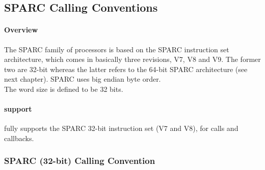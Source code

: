 %
%
%
%

\subsection{SPARC Calling Conventions}

\paragraph{Overview}

The SPARC family of processors is based on the SPARC instruction set architecture, which comes in basically three revisions,
V7, V8\cite{SPARCV8}\cite{SPARCSysV} and V9\cite{SPARCV9}\cite{SPARCV9SysV}. The former two are 32-bit whereas the latter refers to the 64-bit SPARC architecture (see next chapter).
SPARC uses big endian byte order.\\
The word size is defined to be 32 bits.

\paragraph{ support}

 fully supports the SPARC 32-bit instruction set (V7 and V8), for calls and callbacks.

\subsubsection{SPARC (32-bit) Calling Convention}

